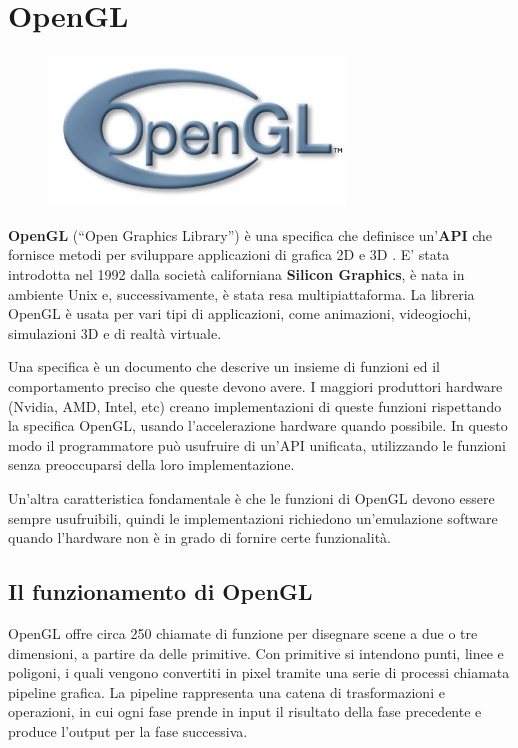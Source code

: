 
\section{OpenGL}

\begin{figure}[hbp]
\centering
\includegraphics[width=0.7\textwidth]{images/openGL/OpenGL_logo.jpg}
\end{figure}


\textbf{OpenGL} (“Open Graphics Library”) è una specifica che definisce un'\textbf{API} che fornisce metodi per sviluppare applicazioni di grafica 2D e 3D \cite{opengl-wiki}. E' stata introdotta nel 1992 dalla società californiana \textbf{Silicon Graphics}, è nata in ambiente Unix e, successivamente, è stata resa multipiattaforma. La libreria OpenGL è usata per vari tipi di applicazioni, come animazioni, videogiochi, simulazioni 3D e di realtà virtuale.

Una specifica è un documento che descrive un insieme di funzioni ed il comportamento preciso che queste devono avere. I maggiori produttori hardware (Nvidia, AMD, Intel, etc) creano implementazioni di queste funzioni rispettando la specifica OpenGL, usando l'accelerazione hardware quando possibile. In questo modo il programmatore può usufruire di un'API unificata, utilizzando le funzioni senza preoccuparsi della loro implementazione.

Un'altra caratteristica fondamentale è che le funzioni di OpenGL devono essere sempre usufruibili, quindi le implementazioni richiedono un'emulazione software quando l'hardware non è in grado di fornire certe funzionalità.

\subsection{Il funzionamento di OpenGL}
OpenGL offre circa 250 chiamate di funzione per disegnare scene a due  o tre dimensioni, a partire da delle primitive. Con primitive si intendono punti, linee e poligoni, i quali vengono convertiti in pixel tramite una serie di processi chiamata pipeline grafica.
La pipeline rappresenta una catena di trasformazioni e operazioni, in cui ogni fase prende in input il risultato della fase precedente e produce l'output per la fase successiva.

